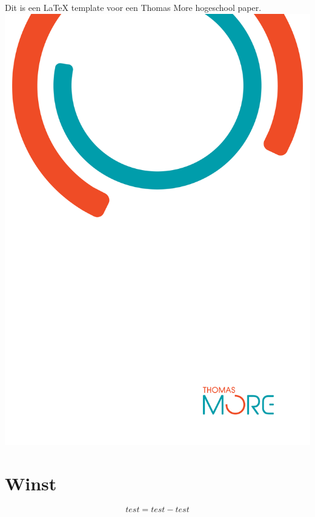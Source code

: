\documentclass[11pt, a4paper, oneside]{book}
\begin{document}
Dit is een LaTeX template voor een Thomas More hogeschool paper.
 \includegraphics[scale=0.5]{images/ThomasMoreBackground.png}

\newpage

\chapter{Winst}

	\begin{mdframed}[backgroundcolor=grijs!40,shadow=false,roundcorner=8pt]
		$$test = test - test$$
	\end{mdframed}


\end{document}
